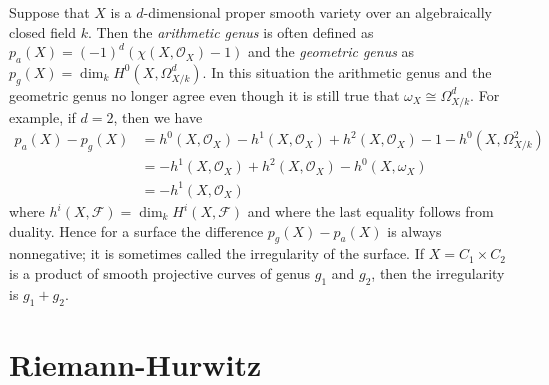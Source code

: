 \begin{remark}
\label{remark-genus-higher-dimension}
Suppose that $X$ is a $d$-dimensional proper smooth variety over
an algebraically closed field $k$.
Then the {\it arithmetic genus} is often defined as
$p_a(X) = (-1)^d(\chi(X, \mathcal{O}_X) - 1)$ and the {\it geometric genus}
as $p_g(X) = \dim_k H^0(X, \Omega^d_{X/k})$. In this situation
the arithmetic genus and the geometric genus no longer agree
even though it is still true that $\omega_X \cong \Omega_{X/k}^d$.
For example, if $d = 2$, then we have
\begin{align*}
p_a(X) - p_g(X) & =
h^0(X, \mathcal{O}_X) - h^1(X, \mathcal{O}_X) + h^2(X, \mathcal{O}_X) - 1
- h^0(X, \Omega^2_{X/k}) \\
& =
- h^1(X, \mathcal{O}_X) + h^2(X, \mathcal{O}_X) - h^0(X, \omega_X) \\
& =
- h^1(X, \mathcal{O}_X)
\end{align*}
where $h^i(X, \mathcal{F}) = \dim_k H^i(X, \mathcal{F})$ and
where the last equality follows from duality.
Hence for a surface the difference $p_g(X) - p_a(X)$ is always
nonnegative; it is sometimes called the irregularity of the surface.
If $X = C_1 \times C_2$ is a product of smooth projective curves of
genus $g_1$ and $g_2$, then the irregularity is $g_1 + g_2$.
\end{remark}






\section{Riemann-Hurwitz}
\label{section-riemann-hurewitz}

